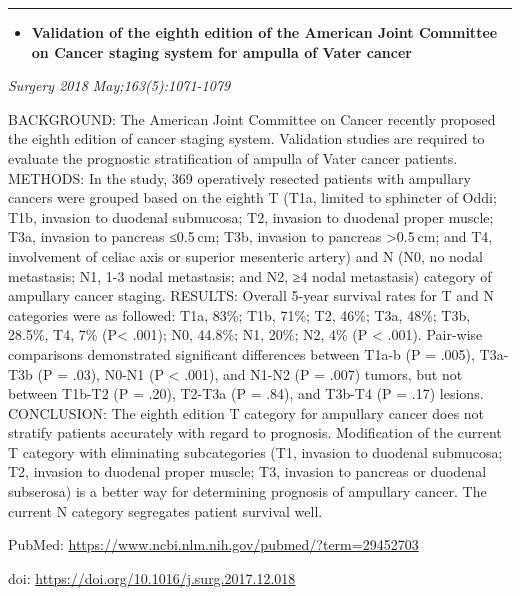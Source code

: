 \documentclass[]{article}
\providecommand{\tightlist}{%
  \setlength{\itemsep}{0pt}\setlength{\parskip}{0pt}}
\begin{document}
{}

{}

\begin{center}\rule{0.5\linewidth}{\linethickness}\end{center}

\begin{itemize}
\tightlist
\item
  \textbf{Validation of the eighth edition of the American Joint
  Committee on Cancer staging system for ampulla of Vater cancer}
\end{itemize}

\emph{Surgery 2018 May;163(5):1071-1079}

BACKGROUND: The American Joint Committee on Cancer recently proposed the
eighth edition of cancer staging system. Validation studies are required
to evaluate the prognostic stratification of ampulla of Vater cancer
patients. METHODS: In the study, 369 operatively resected patients with
ampullary cancers were grouped based on the eighth T (T1a, limited to
sphincter of Oddi; T1b, invasion to duodenal submucosa; T2, invasion to
duodenal proper muscle; T3a, invasion to pancreas ≤0.5 cm; T3b, invasion
to pancreas \textgreater{}0.5 cm; and T4, involvement of celiac axis or
superior mesenteric artery) and N (N0, no nodal metastasis; N1, 1-3
nodal metastasis; and N2, ≥4 nodal metastasis) category of ampullary
cancer staging. RESULTS: Overall 5-year survival rates for T and N
categories were as followed: T1a, 83\%; T1b, 71\%; T2, 46\%; T3a, 48\%;
T3b, 28.5\%, T4, 7\% (P\textless{} .001); N0, 44.8\%; N1, 20\%; N2, 4\%
(P \textless{} .001). Pair-wise comparisons demonstrated significant
differences between T1a-b (P = .005), T3a-T3b (P = .03), N0-N1 (P
\textless{} .001), and N1-N2 (P = .007) tumors, but not between T1b-T2
(P = .20), T2-T3a (P = .84), and T3b-T4 (P = .17) lesions. CONCLUSION:
The eighth edition T category for ampullary cancer does not stratify
patients accurately with regard to prognosis. Modification of the
current T category with eliminating subcategories (T1, invasion to
duodenal submucosa; T2, invasion to duodenal proper muscle; T3, invasion
to pancreas or duodenal subserosa) is a better way for determining
prognosis of ampullary cancer. The current N category segregates patient
survival well.

PubMed: \url{https://www.ncbi.nlm.nih.gov/pubmed/?term=29452703}

doi: \url{https://doi.org/10.1016/j.surg.2017.12.018}

{}
\end{document}
